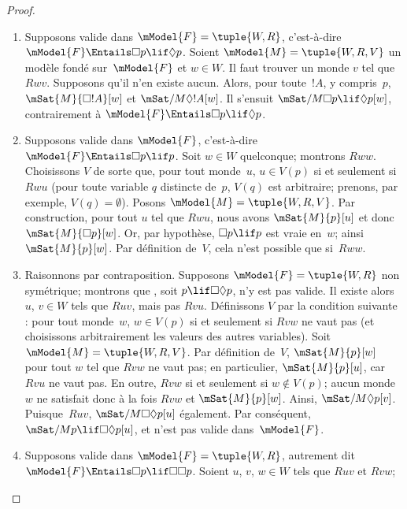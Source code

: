 \documentclass[../../../include/open-logic-section]{subfiles}
\begin{document}
\begin{proof}
  \begin{enumerate}
  \item Supposons  valide dans
    $\mModel{F} = \tuple{W, R}$, c'est-à-dire
    $\mModel{F} \Entails \Box p \lif \Diamond p$. Soient
    $\mModel{M} = \tuple{W, R, V}$ un modèle fondé
    sur~$\mModel{F}$ et $w \in W$. Il faut trouver un monde
    $v$ tel que~$Rwv$. Supposons qu'il n'en existe aucun.
    Alors, pour toute~$!A$, y compris~$p$,
    $\mSat{M}{\Box !A}[w]$ et
    $\mSat/{M}{\Diamond !A}[w]$. Il s'ensuit
    $\mSat/{M}{\Box p \lif \Diamond p}[w]$,
    contrairement à $\mModel{F} \Entails \Box p \lif \Diamond p$.
  \item Supposons  valide dans $\mModel{F}$,
    c'est-à-dire $\mModel{F} \Entails \Box p \lif p$.
    Soit $w \in W$ quelconque; montrons $Rww$.
    Choisissons $V$ de sorte que, pour tout monde~$u$,
    $u \in V(p)$ si et seulement si $Rwu$
    (pour toute variable $q$ distincte de~$p$, $V(q)$ est
    arbitraire; prenons, par exemple, $V(q) = \emptyset$).
    Posons $\mModel{M} = \tuple{W, R, V}$. Par construction,
    pour tout $u$ tel que $Rwu$, nous avons
    $\mSat{M}{p}[u]$ et donc $\mSat{M}{\Box p}[w]$.
    Or, par hypothèse, $\Box p \lif p$ est vraie en~$w$;
    ainsi $\mSat{M}{p}[w]$. Par définition de~$V$,
    cela n'est possible que si~$Rww$.
  \item Raisonnons par contraposition. Supposons
    $\mModel{F}= \tuple{W, R}$ non symétrique; montrons
    que , soit $p \lif \Box\Diamond p$, n'y est pas
    valide. Il existe alors $u$, $v \in W$ tels que $Ruv$,
    mais pas $Rvu$. Définissons $V$ par la condition
    suivante : pour tout monde~$w$, $w \in V(p)$ si et
    seulement si $Rvw$ ne vaut pas (et choisissons
    arbitrairement les valeurs des autres
    variables). Soit $\mModel{M} =\tuple{W, R, V}$.
    Par définition de~$V$, $\mSat{M}{p}[w]$ pour tout
    $w$ tel que $Rvw$ ne vaut pas; en particulier,
    $\mSat{M}{p}[u]$, car $Rvu$ ne vaut pas.
    En outre, $Rvw$ si et seulement si $w \notin V(p)$;
    aucun monde~$w$ ne satisfait donc à la fois $Rvw$
    et $\mSat{M}{p}[w]$. Ainsi,
    $\mSat/{M}{\Diamond p}[v]$. Puisque~$Ruv$,
    $\mSat/{M}{\Box\Diamond p}[u]$ également. Par
    conséquent, $\mSat/{M}{p \lif \Box\Diamond p}[u]$,
    et  n'est pas valide dans~$\mModel{F}$.
  \item Supposons  valide dans
    $\mModel{F} = \tuple{W,R}$, autrement dit
    $\mModel{F} \Entails \Box p \lif \Box\Box p$.
    Soient $u$, $v$, $w \in W$ tels que $Ruv$ et $Rvw$;

\end{enumerate}
\end{proof}
\end{document}

